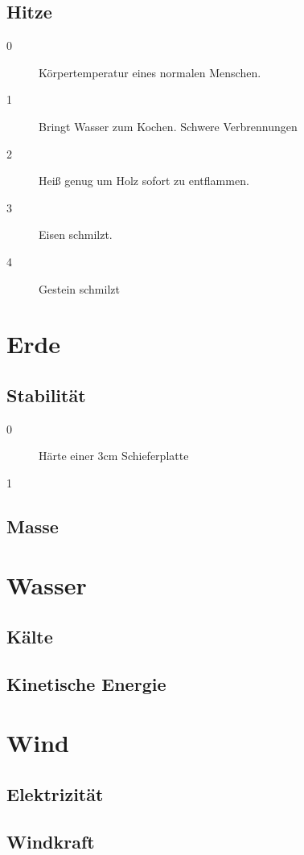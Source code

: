 \documentclass[a4paper,12pt,oneside]{book}
\begin{document}
\section{Hitze}
\begin{description}
\item[0] Körpertemperatur eines normalen Menschen.
\item[1] Bringt Wasser zum Kochen. Schwere Verbrennungen
\item[2] Heiß genug um Holz sofort zu entflammen.
\item[3] Eisen schmilzt.
\item[4] Gestein schmilzt
\end{description}

\chapter{Erde}
\section{Stabilität}
\begin{description}
\item[0]Härte einer 3cm Schieferplatte
\item[1] 
\end{description}
\section{Masse}

\chapter{Wasser}
\section{Kälte}
\section{Kinetische Energie}

\chapter{Wind}
\section{Elektrizität}
\section{Windkraft}
\end{document}

